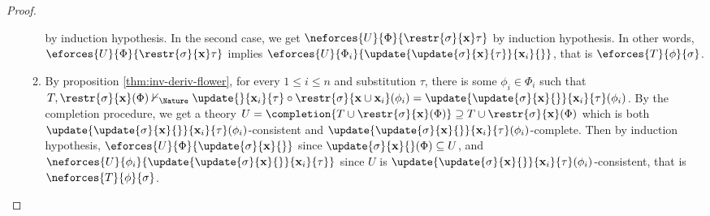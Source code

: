 \begin{proof}
\begin{itemize}
\begin{enumerate}
      by induction hypothesis. In the second case, we get
      $\neforces{U}{\Phi}{\restr{\sigma}{\mathbf{x}}\tau}$ by induction
      hypothesis. In other words,
      $\eforces{U}{\Phi}{\restr{\sigma}{\mathbf{x}}\tau}$ implies
      $\eforces{U}{\Phi_i}{\update{\update{\sigma}{\mathbf{x}}{\tau}}{\mathbf{x}_i}{}}$,
      that is $\eforces{T}{\phi}{\sigma}$.
      \item By proposition \ref{thm:inv-deriv-flower}, for every $1 \leq i \leq
      n$ and substitution $\tau$, there is some $\phi_i \in \Phi_i$ such that
      $T, \restr{\sigma}{\mathbf{x}}(\Phi) \nvdash_\Nature
      \update{}{\mathbf{x}_i}{\tau} \circ \restr{\sigma}{\mathbf{x} \cup
      \mathbf{x}_i}(\phi_i) =
      \update{\update{\sigma}{\mathbf{x}}{}}{\mathbf{x}_i}{\tau}(\phi_i)$. By
      the completion procedure, we get a theory $U = \completion{T \cup
      \restr{\sigma}{\mathbf{x}}(\Phi)} \supseteq T \cup
      \restr{\sigma}{\mathbf{x}}(\Phi)$ which is both
      $\update{\update{\sigma}{\mathbf{x}}{}}{\mathbf{x}_i}{\tau}(\phi_i)$-consistent
      and
      $\update{\update{\sigma}{\mathbf{x}}{}}{\mathbf{x}_i}{\tau}(\phi_i)$-complete.
      Then by induction hypothesis,
      $\eforces{U}{\Phi}{\update{\sigma}{\mathbf{x}}{}}$ since
      $\update{\sigma}{\mathbf{x}}{}(\Phi) \subseteq U$, and
      $\neforces{U}{\phi_i}{\update{\update{\sigma}{\mathbf{x}}{}}{\mathbf{x}_i}{\tau}}$
      since $U$ is
      $\update{\update{\sigma}{\mathbf{x}}{}}{\mathbf{x}_i}{\tau}(\phi_i)$-consistent,
      that is $\neforces{T}{\phi}{\sigma}$.
    \end{enumerate}
  \end{itemize}
\end{proof}

